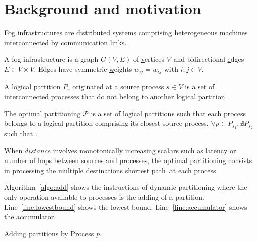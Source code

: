 
\section{Background and motivation}
\label{sec:background}

Fog infrastructures are distributed systems comprising heterogeneous
machines interconnected by communication links.

\begin{definition}
  A fog infrastructure is a \underline{g}raph $G(V, E)$ of
  \underline{v}ertices $V$ and bidirectional \underline{e}dges $E \in
  V \times V$. Edges have symmetric \underline{w}eights $w_{ij} =
  w_{ij}$ with $i, j \in V$.
\end{definition}

\begin{definition}
  A logical \underline{p}artition $P_s$ originated at a
  \underline{s}ource process $s \in V$ is a set of interconnected
  processes that do not belong to another logical partition.
\end{definition}

\begin{definition}
  The optimal partitioning $\mathcal{P}$ is a set of logical
  partitions such that each process belongs to a logical partition
  comprising its closest source process. $\forall p \in P_{s_1},
  \nexists P_{s_2}$ such that .
\end{definition}

When $distance$ involves monotonically increasing scalars such as
latency or number of hops between sources and processes, the optimal
partitioning consists in processing the multiple destinations shortest
path~\REF at each process. 


Algorithm~\ref{algo:add} shows the instructions of dynamic
partitioning where the only operation available to processes is the
adding of a partition.  Line~\ref{line:lowestbound} shows the lowest
bound. Line~\ref{line:accumulator} shows the accumulator.

\begin{algorithm}
  
  \caption{\label{algo:add}Adding partitions by Process $p$.}
\end{algorithm}


